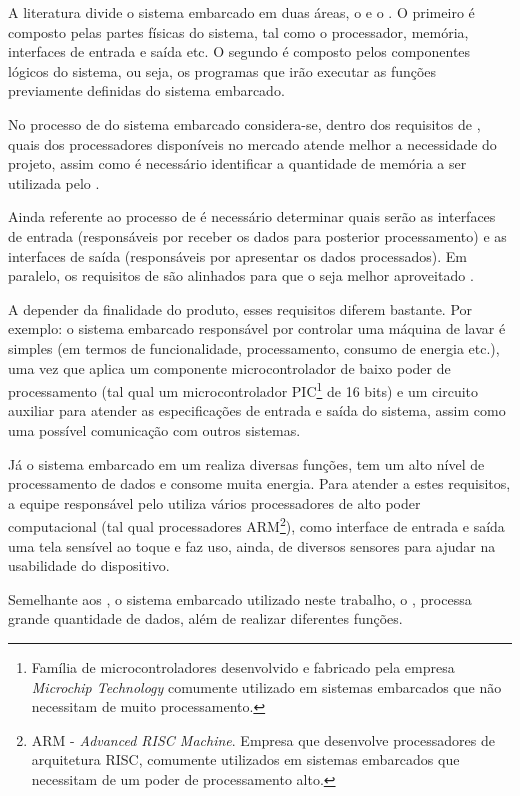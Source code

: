A literatura divide o sistema embarcado em duas áreas, o \hardware[] e o 
\software. O primeiro é composto pelas partes físicas do sistema, 
tal como o processador, memória, interfaces de entrada e saída etc. O segundo é
composto pelos componentes lógicos do sistema, ou seja, os programas que 
irão executar as funções previamente definidas do sistema embarcado.

No processo de \design[] do sistema embarcado considera-se, dentro dos
requisitos de \hardware, quais dos processadores disponíveis no mercado atende
melhor a necessidade do projeto, assim como é necessário identificar a
quantidade de memória a ser utilizada pelo \software[]. 

Ainda referente ao processo de \design[] é necessário determinar quais serão as
interfaces de entrada (responsáveis por receber os dados para posterior
processamento) e as interfaces de saída (responsáveis por apresentar os dados
processados). Em paralelo, os requisitos de \software[] são alinhados para que o
\hardware[] seja melhor aproveitado \cite{wolf2012computers}.

A depender da finalidade do produto, esses requisitos diferem bastante. Por
exemplo: o sistema embarcado responsável por controlar uma máquina de lavar é
simples (em termos de funcionalidade, processamento, consumo de energia etc.),
uma vez que aplica um componente microcontrolador de baixo poder de
processamento (tal qual um microcontrolador PIC\footnote{Família de
microcontroladores desenvolvido e fabricado pela empresa \textit{Microchip
Technology} comumente utilizado em sistemas embarcados que não necessitam de
muito processamento.} de 16 bits) e um circuito auxiliar para atender as
especificações de entrada e saída do sistema, assim como uma possível
comunicação com outros sistemas.

Já o sistema embarcado em um \smartphone[] realiza diversas funções, tem um
alto nível de processamento de dados e consome muita energia. Para atender a
estes requisitos, a equipe responsável pelo \design[] utiliza vários
processadores de alto poder computacional (tal qual processadores
ARM\footnote{ARM - \textit{Advanced RISC Machine}. Empresa que desenvolve 
processadores de arquitetura RISC, comumente utilizados em sistemas
embarcados que necessitam de um poder de processamento alto.}), como interface
de entrada e saída uma tela sensível ao toque e faz uso, ainda, de diversos
sensores para ajudar na usabilidade do dispositivo.

Semelhante aos \smartphones, o sistema embarcado utilizado neste trabalho, o
\stb[], processa grande quantidade de dados, além de realizar diferentes funções. 

